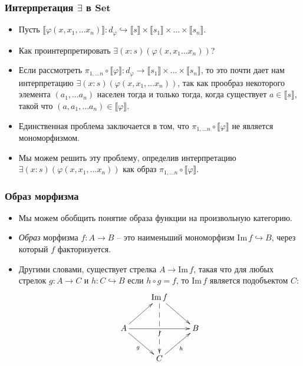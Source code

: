 \documentclass{beamer}
\theoremstyle{definition}
\newcommand{\cat}[1]{\mathbf{#1}}
\newcommand{\Set}{\cat{Set}}
\renewcommand{\ll}{\llbracket}
\newcommand{\rr}{\rrbracket}
\newcommand{\fs}[1]{\mathrm{#1}}
\newcommand{\im}{\fs{Im}}
\begin{document}
\begin{frame}
\frametitle{Интерпретация $\exists$ в $\Set$}
\begin{itemize}
\item Пусть $\ll \varphi(x, x_1, \ldots x_n) \rr : d_\varphi \hookrightarrow \ll s \rr \times \ll s_1 \rr \times \ldots \times \ll s_n \rr$.
\item Как проинтерпретировать $\exists (x : s) (\varphi(x, x_1 \ldots x_n))$?
\item Если рассмотреть $\pi_{1, \ldots n} \circ \ll \varphi \rr : d_\varphi \to \ll s_1 \rr \times \ldots \times \ll s_n \rr$, то это почти дает нам интерпретацию $\exists (x : s) (\varphi(x, x_1, \ldots x_n))$,
так как прообраз некоторого элемента $(a_1, \ldots a_n)$ населен тогда и только тогда, когда существует $a \in \ll s \rr$, такой что $(a, a_1, \ldots a_n) \in \ll \varphi \rr$.
\item Единственная проблема заключается в том, что $\pi_{1, \ldots n} \circ \ll \varphi \rr$ не является мономорфизмом.
\item Мы можем решить эту проблему, определив интерпретацию $\exists (x : s) (\varphi(x, x_1, \ldots x_n))$ как образ $\pi_{1, \ldots n} \circ \ll \varphi \rr$.
\end{itemize}
\end{frame}

\begin{frame}
\frametitle{Образ морфизма}
\begin{itemize}
\item Мы можем обобщить понятие образа функции на произвольную категорию.
\item \emph{Образ} морфизма $f : A \to B$ -- это наименьший мономорфизм $\im\,f \hookrightarrow B$, через который $f$ факторизуется.
\item Другими словами, существует стрелка $A \to \im\,f$, такая что для любых стрелок $g : A \to C$ и $h : C \hookrightarrow B$ если $h \circ g = f$,
то $\im\,f$ является подобъектом $C$:
\[ \xymatrix{                               & \im\,f \ar[dr] \ar@{-->}[dd] &   \\
              A \ar[ur] \ar[dr]_g \ar[rr]_f &                              & B \\
                                            & C \ar[ur]_h
            } \]
\end{itemize}
\end{frame}
\end{document}
